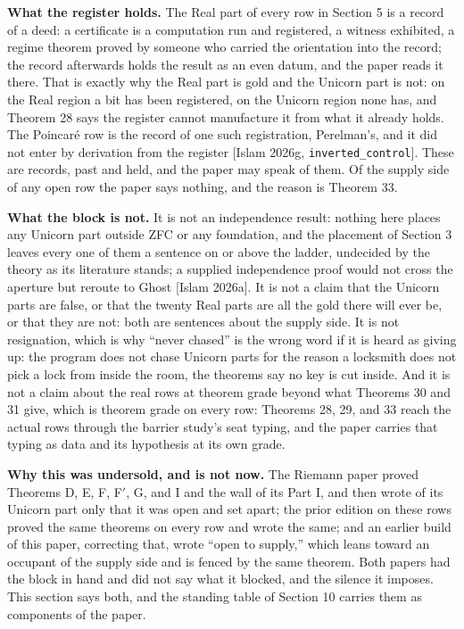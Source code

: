 \documentclass[10pt,twocolumn]{article}
\begin{document}
\textbf{What the register holds.} The Real part of every row in Section
5 is a record of a deed: a certificate is a computation run and
registered, a witness exhibited, a regime theorem proved by someone who
carried the orientation into the record; the record afterwards holds the
result as an even datum, and the paper reads it there. That is exactly
why the Real part is gold and the Unicorn part is not: on the Real
region a bit has been registered, on the Unicorn region none has, and
Theorem 28 says the register cannot manufacture it from what it already
holds. The Poincaré row is the record of one such registration,
Perelman's, and it did not enter by derivation from the register
{[}Islam 2026g, \texttt{inverted\_control}{]}. These are records, past
and held, and the paper may speak of them. Of the supply side of any
open row the paper says nothing, and the reason is Theorem 33.

\textbf{What the block is not.} It is not an independence result:
nothing here places any Unicorn part outside ZFC or any foundation, and
the placement of Section 3 leaves every one of them a sentence on or
above the ladder, undecided by the theory as its literature stands; a
supplied independence proof would not cross the aperture but reroute to
Ghost {[}Islam 2026a{]}. It is not a claim that the Unicorn parts are
false, or that the twenty Real parts are all the gold there will ever
be, or that they are not: both are sentences about the supply side. It
is not resignation, which is why ``never chased'' is the wrong word if
it is heard as giving up: the program does not chase Unicorn parts for
the reason a locksmith does not pick a lock from inside the room, the
theorems say no key is cut inside. And it is not a claim about the real
rows at theorem grade beyond what Theorems 30 and 31 give, which is
theorem grade on every row: Theorems 28, 29, and 33 reach the actual
rows through the barrier study's seat typing, and the paper carries that
typing as data and its hypothesis at its own grade.

\textbf{Why this was undersold, and is not now.} The Riemann paper
proved Theorems D, E, F, F\('\), G, and I and the wall of its Part I,
and then wrote of its Unicorn part only that it was open and set apart;
the prior edition on these rows proved the same theorems on every row
and wrote the same; and an earlier build of this paper, correcting that,
wrote ``open to supply,'' which leans toward an occupant of the supply
side and is fenced by the same theorem. Both papers had the block in
hand and did not say what it blocked, and the silence it imposes. This
section says both, and the standing table of Section 10 carries them as
components of the paper.
\end{document}
